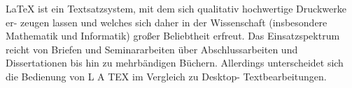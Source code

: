 LaTeX ist ein Textsatzsystem, mit dem sich qualitativ hochwertige Druckwerke er-
zeugen lassen und welches sich daher in der Wissenschaft (insbesondere Mathematik
und Informatik) großer Beliebtheit erfreut. Das Einsatzspektrum reicht von Briefen und
Seminararbeiten über Abschlussarbeiten und Dissertationen bis hin zu mehrbändigen
Büchern. Allerdings unterscheidet sich die Bedienung von L A TEX im Vergleich zu Desktop-
Textbearbeitungen.